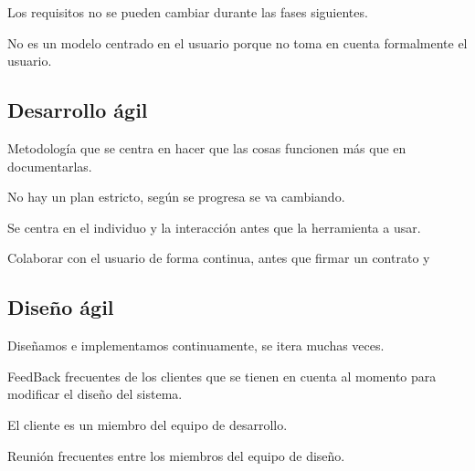 \documentclass[12pt, twoside, openright]{report} %
\begin{document}
\begin{figure}[H]
{}
\end{figure}

Los requisitos no se pueden cambiar durante las fases siguientes.

No es un modelo centrado en el usuario porque no toma en cuenta
formalmente el usuario.
\pagebreak

\subsection{Desarrollo ágil}



Metodología que se centra en hacer que las cosas funcionen más que
en documentarlas.

No hay un plan estricto, según se progresa se va cambiando.

Se centra en el individuo y la interacción antes que la herramienta
a usar.

Colaborar con el usuario de forma continua, antes que firmar un
contrato y


\subsection{Diseño ágil}


Diseñamos e implementamos continuamente, se itera muchas veces.

FeedBack frecuentes de los clientes que se tienen en cuenta al
momento para modificar el diseño del sistema.

El cliente es un miembro del equipo de desarrollo.

Reunión frecuentes entre los miembros del equipo de diseño.
\end{document}
